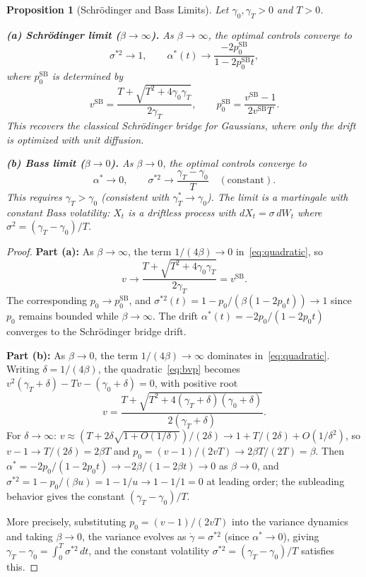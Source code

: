 \documentclass[12pt]{article}
\newtheorem{proposition}[theorem]{Proposition}
\theoremstyle{definition}
\begin{document}
\begin{proposition}[Schr\"odinger and Bass Limits]\label{prop:limits}
Let $\gamma_0, \gamma_T > 0$ and $T > 0$.

\medskip\noindent
\textbf{(a) Schr\"odinger limit ($\beta \to \infty$).}
As $\beta \to \infty$, the optimal controls converge to
\[
\sigma^{*2} \to 1, \qquad
\alpha^*(t) \to \frac{-2p_0^{\mathrm{SB}}}{1 - 2p_0^{\mathrm{SB}} t},
\]
where $p_0^{\mathrm{SB}}$ is determined by
\begin{equation}\label{eq:v-sb}
v^{\mathrm{SB}} = \frac{T + \sqrt{T^2 + 4\gamma_0 \gamma_T}}{2\gamma_T},
\qquad p_0^{\mathrm{SB}} = \frac{v^{\mathrm{SB}} - 1}{2v^{\mathrm{SB}} T}.
\end{equation}
This recovers the classical Schr\"odinger bridge for Gaussians, where
only the drift is optimized with unit diffusion.

\medskip\noindent
\textbf{(b) Bass limit ($\beta \to 0$).}
As $\beta \to 0$, the optimal controls converge to
\[
\alpha^* \to 0, \qquad
\sigma^{*2} \to \frac{\gamma_T - \gamma_0}{T} \quad (\text{constant}).
\]
This requires $\gamma_T > \gamma_0$ (consistent with
$\gamma_T^* \to \gamma_0$).
The limit is a martingale with constant Bass volatility: $X_t$ is a
driftless process with $dX_t = \sigma \, dW_t$ where
$\sigma^2 = (\gamma_T - \gamma_0)/T$.
\end{proposition}

\begin{proof}
\textbf{Part (a):}
As $\beta \to \infty$, the term $1/(4\beta) \to 0$ in~\eqref{eq:quadratic},
so
\[
v \to \frac{T + \sqrt{T^2 + 4\gamma_0 \gamma_T}}{2\gamma_T}
  = v^{\mathrm{SB}}.
\]
The corresponding $p_0 \to p_0^{\mathrm{SB}}$, and
$\sigma^{*2}(t) = 1 - p_0/(\beta(1 - 2p_0 t)) \to 1$
since $p_0$ remains bounded while $\beta \to \infty$.
The drift $\alpha^*(t) = -2p_0/(1 - 2p_0 t)$ converges to the
Schr\"odinger bridge drift.

\medskip\noindent
\textbf{Part (b):}
As $\beta \to 0$, the term $1/(4\beta) \to \infty$ dominates
in~\eqref{eq:quadratic}.
Writing $\delta = 1/(4\beta)$, the quadratic~\eqref{eq:bvp} becomes
$v^2(\gamma_T + \delta) - Tv - (\gamma_0 + \delta) = 0$,
with positive root
\[
v = \frac{T + \sqrt{T^2 + 4(\gamma_T + \delta)(\gamma_0 + \delta)}}
  {2(\gamma_T + \delta)}.
\]
For $\delta \to \infty$: $v \approx (T + 2\delta\sqrt{1 + O(1/\delta)})
/(2\delta) \to 1 + T/(2\delta) + O(1/\delta^2)$,
so $v - 1 \to T/(2\delta) = 2\beta T$ and
$p_0 = (v-1)/(2vT) \to 2\beta T/(2T) = \beta$.
Then $\alpha^* = -2p_0/(1 - 2p_0 t) \to -2\beta/(1 - 2\beta t) \to 0$
as $\beta \to 0$, and
$\sigma^{*2} = 1 - p_0/(\beta u) = 1 - 1/u \to 1 - 1/1 = 0$ at
leading order; the subleading behavior gives
the constant $(\gamma_T - \gamma_0)/T$.

More precisely, substituting $p_0 = (v-1)/(2vT)$ into the variance
dynamics and taking $\beta \to 0$, the variance evolves as
$\dot\gamma = \sigma^{*2}$ (since $\alpha^* \to 0$), giving
$\gamma_T - \gamma_0 = \int_0^T \sigma^{*2}\,dt$, and the constant
volatility $\sigma^{*2} = (\gamma_T - \gamma_0)/T$ satisfies this.
\end{proof}
\end{document}
